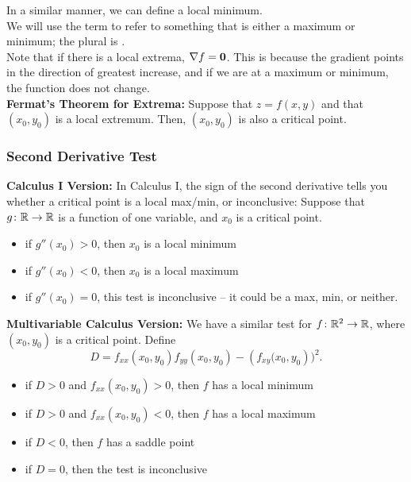 In a similar manner, we can define a local minimum. \\


We will use the term  to refer to something that is either a maximum or minimum; the plural is . \\

Note that if there is a local extrema, \(\nabla f = \mathbf{0}\). This is because the gradient points in the direction of greatest increase, and if we are at a maximum or minimum, the function does not change. \\

\textbf{Fermat's Theorem for Extrema:} Suppose that \(z = f(x, y)\) and that \((x_{0}, y_{0})\) is a local extremum. Then, \((x_{0}, y_{0})\) is also a critical point.

\subsubsection{Second Derivative Test}

\textbf{Calculus I Version:} In Calculus I, the sign of the second derivative tells you whether a critical point is a local max/min, or inconclusive: Suppose that \(g \colon \mathbb{R} \to \mathbb{R}\) is a function of one variable, and \(x_{0}\) is a critical point.

\begin{itemize}
    \item if \(g''(x_{0}) > 0\), then \(x_{0}\) is a local minimum
    \item if \(g''(x_{0}) < 0\), then \(x_{0}\) is a local maximum
    \item if \(g''(x_{0}) = 0\), this test is inconclusive – it could be a max, min, or neither.
\end{itemize}

\newpage

\textbf{Multivariable Calculus Version:} We have a similar test for \(f \colon \mathbb{R}^{2} \to \mathbb{R}\), where \((x_{0}, y_{0})\) is a critical point. Define
\[
D = f_{xx}(x_{0}, y_{0})f_{yy}(x_{0}, y_{0}) - (f_{xy}\bigl(x_{0}, y_{0})\bigr)^{2}.
\]

\begin{itemize}
    \item if \(D > 0\) and \(f_{xx}(x_{0}, y_{0}) > 0\), then \(f\) has a local minimum
    \item if \(D > 0\) and \(f_{xx}(x_{0}, y_{0}) < 0\), then \(f\) has a local maximum
    \item if \(D < 0\), then \(f\) has a saddle point
    \item if \(D = 0\), then the test is inconclusive
\end{itemize}


